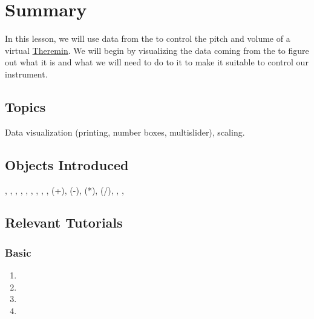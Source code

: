 
\graphicspath{{\imagedir}}

\date{\today}


\maketitle

\section*{Summary}
In this lesson, we will use data from the \gt{} to control the pitch and volume
of a virtual \href{http://en.wikipedia.org/wiki/Theremin}{Theremin}.  We will begin
by visualizing the data coming from the \gt{} to figure out what it is and 
what we will need to do to it to make it suitable to control our instrument.

\subsection*{Topics}
Data visualization (printing, number boxes, multislider), scaling.

\subsection*{Objects Introduced}
, , , , , ,
, , ,  (+),  (-),   (*),  (/),
, , 

\subsection*{Relevant Tutorials}
\subsubsection*{Basic}
\begin{enumerate}
\item {}
\item {}
\item {}
\item {}
\end{enumerate}
